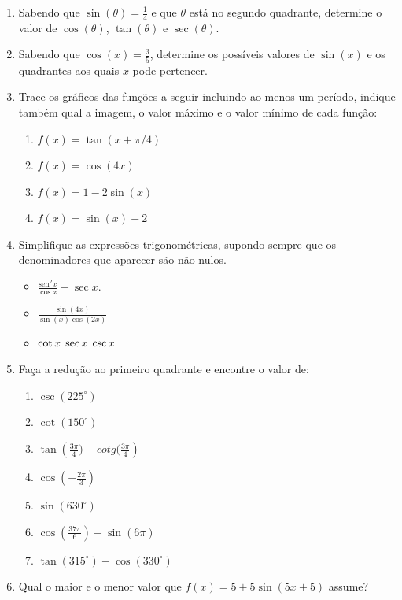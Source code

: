 \begin{enumerate}
 \item Sabendo que $\sin(\theta)=\frac{1}{4}$ e que $\theta$ está no segundo quadrante, determine o valor de $\cos(\theta)$, $\tan(\theta)$ e $\sec(\theta)$.
 \item Sabendo que $\cos(x)= \frac{3}{5}$, determine os possíveis valores de $\sin(x)$ e os quadrantes aos quais $x$ pode pertencer.
\item Trace os gráficos das funções a seguir incluindo ao menos um período, indique também qual a imagem, o valor máximo e o valor mínimo de cada função:
\begin{enumerate}
\item $f(x)=\tan(x+\pi/4)$
\item $f(x)=\cos(4x)$
\item $f(x)=1-2\sin (x)$
\item $f(x)=\sin(x)+2$
\end{enumerate}

\item Simplifique as expressões trigonométricas, supondo sempre que os denominadores que aparecer são não nulos.
\begin{itemize}
    \item[a)] $\frac{\text{sen}^2x}{\cos x}-\sec x$.
    \item[b)] $\frac{\sin(4x)}{\sin(x)\cos(2x)}$
    \item[c)] $\cot x \hspace{0,1cm} \sec x \hspace{0,1cm} \csc x $
\end{itemize}
 \item Faça a redução ao  primeiro quadrante e encontre o valor de:
     \begin{enumerate}
         \item $\csc(225^{\circ})$
         \item $\cot(150^{\circ})$
         \item $\tan\left(\frac{3\pi}{4})- cotg(\frac{3\pi}{4}\right)$
         \item $\cos\left(-\frac{2\pi}{3}\right)$
         \item $\sin(630^{\circ})$
         \item $\cos\left( \frac{37\pi}{6}\right)- \sin(6\pi)$
         \item $\tan(315^{\circ})-\cos(330^{\circ})$
     \end{enumerate}

\item  Qual o maior e o menor valor que $f(x) = 5+5\sin(5x+5)$ assume?


\end{enumerate}
